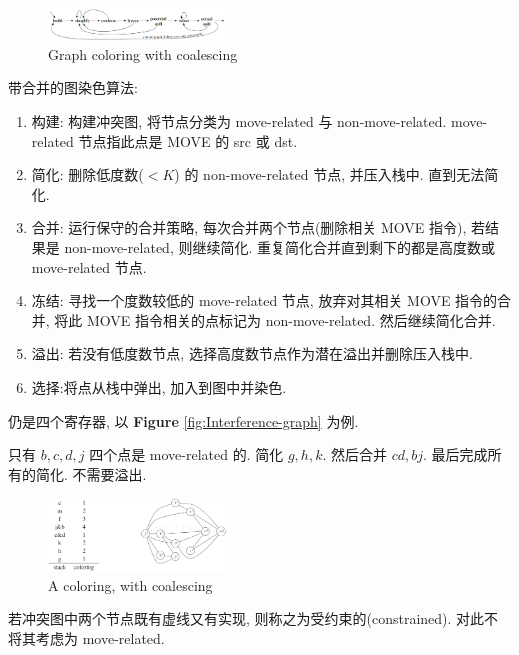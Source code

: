 \begin{figure}[!htb]
    \centering
    \includegraphics[width=0.42\textwidth]{pic/CP11/Graph coloring with coalescing}
    \caption{Graph coloring with coalescing}
\end{figure}

带合并的图染色算法:
\begin{enumerate}
    \item 构建: 构建冲突图, 将节点分类为 move-related 与 non-move-related. move-related 节点指此点是 MOVE 的 src 或 dst. 
    \item 简化: 删除低度数($<K$) 的 non-move-related 节点, 并压入栈中. 直到无法简化. 
    \item 合并: 运行保守的合并策略, 每次合并两个节点(删除相关 MOVE 指令), 若结果是 non-move-related, 则继续简化. 重复简化合并直到剩下的都是高度数或 move-related 节点. 
    \item 冻结: 寻找一个度数较低的 move-related 节点, 放弃对其相关 MOVE 指令的合并, 将此 MOVE 指令相关的点标记为 non-move-related. 然后继续简化合并.
    \item 溢出: 若没有低度数节点, 选择高度数节点作为潜在溢出并删除压入栈中. 
    \item 选择:将点从栈中弹出, 加入到图中并染色. 
\end{enumerate}

\begin{example}
    仍是四个寄存器, 以 \textbf{Figure} \ref{fig:Interference-graph} 为例. 

    只有 $b,c,d,j$ 四个点是 move-related 的. 简化 $g,h,k$. 然后合并 $cd, bj$. 最后完成所有的简化. 不需要溢出. 

    \begin{figure}[!htb]
        \centering
        \includegraphics[width=0.42\textwidth]{pic/CP11/A coloring, with coalescing}
        \caption{A coloring, with coalescing}
    \end{figure}
    
\end{example} 

若冲突图中两个节点既有虚线又有实现, 则称之为受约束的(constrained). 对此不将其考虑为 move-related. 

